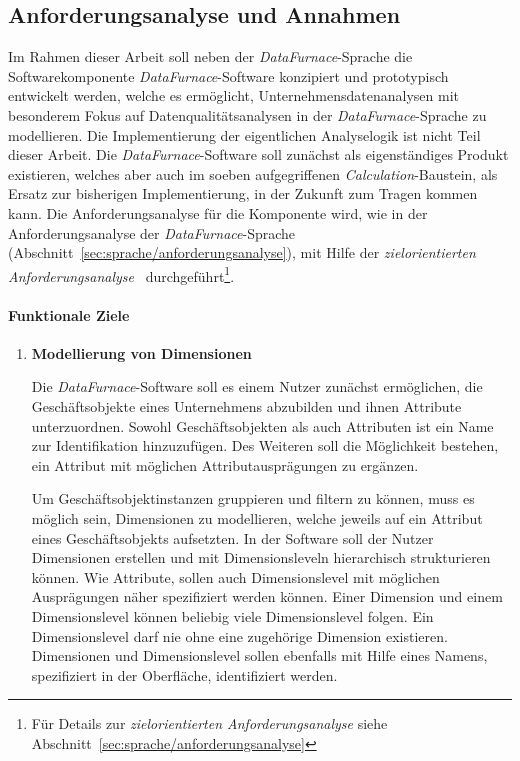 \documentclass[
  language=german, %
  type=bachelor,%
  ngerman
]{isthesis}
\begin{document}
\begin{content}
  \section{Anforderungsanalyse und Annahmen}\label{sec:software/anforderungsanalyse}

	Im Rahmen dieser Arbeit soll neben der \textit{DataFurnace}-Sprache die
	Softwarekomponente \textit{DataFurnace}-Software konzipiert und
	prototypisch entwickelt werden, welche es ermöglicht,
	Unternehmensdatenanalysen mit besonderem Fokus auf Datenqualitätsanalysen
	in der \textit{DataFurnace}-Sprache zu modellieren. Die Implementierung der
	eigentlichen Analyselogik ist nicht Teil dieser Arbeit.  Die
	\textit{DataFurnace}-Software soll zunächst als eigenständiges Produkt
	existieren, welches aber auch im soeben aufgegriffenen
	\textit{Calculation}-Baustein, als Ersatz zur bisherigen Implementierung, in
	der Zukunft zum Tragen kommen kann. Die Anforderungsanalyse für die
	Komponente wird, wie in der Anforderungsanalyse der
	\textit{DataFurnace}-Sprache
	(Abschnitt~\ref{sec:sprache/anforderungsanalyse}), mit Hilfe der
	\textit{zielorientierten Anforderungsanalyse}~\cite[][]{van2001goal}
	durchgeführt\footnote{Für Details zur \textit{zielorientierten
	Anforderungsanalyse} siehe Abschnitt~\ref{sec:sprache/anforderungsanalyse}}. 


  \paragraph{Funktionale Ziele}
  \begin{enumerate}
    \item \textbf{Modellierung von Dimensionen}

      Die \textit{DataFurnace}-Software soll es einem Nutzer zunächst
      ermöglichen, die Geschäftsobjekte eines Unternehmens abzubilden und ihnen
      Attribute unterzuordnen. Sowohl Geschäftsobjekten als auch Attributen
      ist ein Name zur Identifikation hinzuzufügen. Des Weiteren soll die
      Möglichkeit bestehen, ein Attribut mit möglichen Attributausprägungen zu
      ergänzen.

      Um Geschäftsobjektinstanzen gruppieren und filtern zu können, muss es
      möglich sein, Dimensionen zu modellieren, welche jeweils auf ein Attribut
      eines Geschäftsobjekts aufsetzten. In der Software soll der Nutzer
      Dimensionen erstellen und mit Dimensionsleveln hierarchisch strukturieren
      können. Wie Attribute, sollen auch Dimensionslevel mit möglichen
      Ausprägungen näher spezifiziert werden können. Einer Dimension und einem
      Dimensionslevel können beliebig viele Dimensionslevel folgen. Ein
      Dimensionslevel darf nie ohne eine zugehörige Dimension existieren.
      Dimensionen und Dimensionslevel sollen ebenfalls mit Hilfe eines Namens,
      spezifiziert in der Oberfläche, identifiziert werden.


\end{enumerate}
\end{content}
\end{document}

